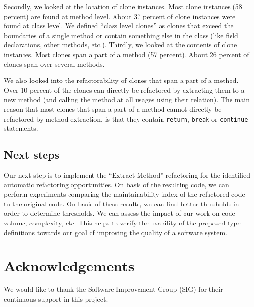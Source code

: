 \documentclass[a4paper]{article}
\begin{document}
Secondly, we looked at the location of clone instances. Most clone instances (58 percent) are found at method level. About 37 percent of clone instances were found at class level. We defined ``class level clones'' as clones that exceed the boundaries of a single method or contain something else in the class (like field declarations, other methods, etc.). Thirdly, we looked at the contents of clone instances. Most clones span a part of a method (57 percent). About 26 percent of clones span over several methods.

We also looked into the refactorability of clones that span a part of a method. Over 10 percent of the clones can directly be refactored by extracting them to a new method (and calling the method at all usages using their relation). The main reason that most clones that span a part of a method cannot directly be refactored by method extraction, is that they contain \texttt{return}, \texttt{break} or \texttt{continue} statements.

\subsection{Next steps}
Our next step is to implement the ``Extract Method'' refactoring for the identified automatic refactoring opportunities. On basis of the resulting code, we can perform experiments comparing the maintainability index of the refactored code to the original code. On basis of these results, we can find better thresholds in order to determine thresholds. We can assess the impact of our work on code volume, complexity, etc. This helps to verify the usability of the proposed type definitions towards our goal of improving the quality of a software system.

\section*{Acknowledgements}
We would like to thank the Software Improvement Group (SIG) for their continuous support in this project.



\end{document}
